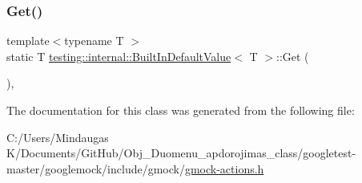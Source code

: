 \subsubsection{\texorpdfstring{Get()}{Get()}\hspace{0.1cm}{\footnotesize\ttfamily [3/3]}}
{\footnotesize\ttfamily template$<$typename T $>$ \\
static T \mbox{\hyperlink{classtesting_1_1internal_1_1_built_in_default_value}{testing\+::internal\+::\+Built\+In\+Default\+Value}}$<$ T $>$\+::Get (\begin{DoxyParamCaption}{ }\end{DoxyParamCaption})\hspace{0.3cm}{\ttfamily [inline]}, {\ttfamily [static]}}



The documentation for this class was generated from the following file\+:\begin{DoxyCompactItemize}
\item 
C\+:/\+Users/\+Mindaugas K/\+Documents/\+Git\+Hub/\+Obj\+\_\+\+Duomenu\+\_\+apdorojimas\+\_\+class/googletest-\/master/googlemock/include/gmock/\mbox{\hyperlink{googletest-master_2googlemock_2include_2gmock_2gmock-actions_8h}{gmock-\/actions.\+h}}\end{DoxyCompactItemize}
